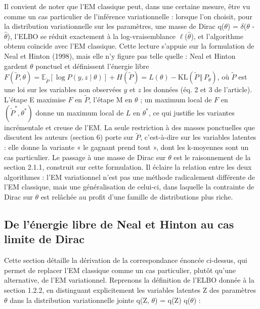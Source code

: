 Il convient de noter que l'EM classique peut, dans une certaine mesure, être vu comme un cas particulier de l'inférence variationnelle : lorsque l'on choisit, pour la distribution variationnelle sur les paramètres, une masse de Dirac q($\theta $) = $\delta $($\theta $ - $\hat{\theta }$), l'ELBO se réduit exactement à la log-vraisemblance $\ell $($\hat{\theta }$), et l'algorithme obtenu coïncide avec l'EM classique. Cette lecture s'appuie sur la formulation de Neal et Hinton (1998), mais elle n'y figure pas telle quelle : Neal et Hinton gardent $\theta$ ponctuel et définissent l'énergie libre $F(\tilde P, \theta) = \mathbb{E}_{\tilde P}[\log P(y, z \mid \theta)] + H(\tilde P) = L(\theta) - \mathrm{KL}(\tilde P \,\Vert\, P_\theta)$, où $\tilde P$ est une loi sur les variables non observées $y$ et $z$ les données (éq. 2 et 3 de l'article). L'étape E maximise $F$ en $\tilde P$, l'étape M en $\theta$ ; un maximum local de $F$ en $(\tilde P^*, \theta^*)$ donne un maximum local de $L$ en $\theta^*$, ce qui justifie les variantes incrémentale et creuse de l'EM. La seule restriction à des masses ponctuelles que discutent les auteurs (section 6) porte sur $\tilde P$, c'est-à-dire sur les variables latentes : elle donne la variante « le gagnant prend tout », dont les k-moyennes sont un cas particulier. Le passage à une masse de Dirac sur $\theta$ est le raisonnement de la section 2.1.1, construit sur cette formulation. Il éclaire la relation entre les deux algorithmes : l'EM variationnel n'est pas une méthode radicalement différente de l'EM classique, mais une généralisation de celui-ci, dans laquelle la contrainte de Dirac sur $\theta $ est relâchée au profit d'une famille de distributions plus riche.

\subsection{De l'énergie libre de Neal et Hinton au cas limite de Dirac}
Cette section détaille la dérivation de la correspondance énoncée ci-dessus, qui permet de replacer l'EM classique comme un cas particulier, plutôt qu'une alternative, de l'EM variationnel. Reprenons la définition de l'ELBO donnée à la section 1.2.2, en distinguant explicitement les variables latentes Z des paramètres $\theta $ dans la distribution variationnelle jointe q(Z, $\theta $) = q(Z) q($\theta $) :

